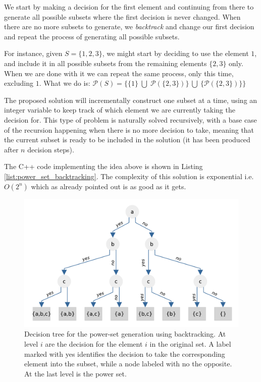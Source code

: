 We start by making a decision for the first element and continuing from there to generate all possible subsets
where the first decision is never changed. 
When there are no more subsets to generate, we \textit{backtrack} and change our first
decision and repeat the process of generating all possible subsets.

For instance, given $S=\{1,2,3\}$, we might start by deciding to use the element $1$, and include it in all possible subsets from the remaining elements $\{2, 3\}$ only. 
When we are done with it we can repeat the same process, only this time, excluding $1$. What we do is: $\mathcal{P}(S)= \{\{1\} \; \bigcup \;\mathcal{P}(\{2,3\})\} \: \bigcup \: \{\mathcal{P}(\{2,3\})\}\} 
$

The proposed solution will incrementally construct one subset at a time, 
using an integer variable to keep track of which element we are currently taking the decision for.
This type of problem is naturally solved recursively, with a base case of the recursion happening when there is no more decision
to take, meaning that the current subset is ready to be included in the solution (it has been
produced after $n$ decision steps).

The C++ code implementing the idea above is shown in Listing \ref{list:power_set_backtracking}. The complexity of this solution is exponential i.e. $O(2^n)$ which as already pointed out is as good as
it gets.







\begin{figure}
    \centering
    \includegraphics[width=\textwidth]{sources/power_set/images/tree}
    \caption[Decision tree for the power-set generation using backtracking.]{Decision tree for the power-set generation using backtracking. At level $i$ are the decision for the element $i$ in the original set. A label marked with yes identifies the decision to take the corresponding element into the subset, while a node labeled with no the opposite. At the last level is the power set.}
    \label{ref:power_set_decision_trees}
\end{figure}

